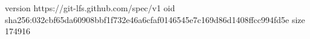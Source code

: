 version https://git-lfs.github.com/spec/v1
oid sha256:032cbf65da60908bbf1f732e46a6cfaf0146545e7c169d86d1408ffcc994fd5e
size 174916

